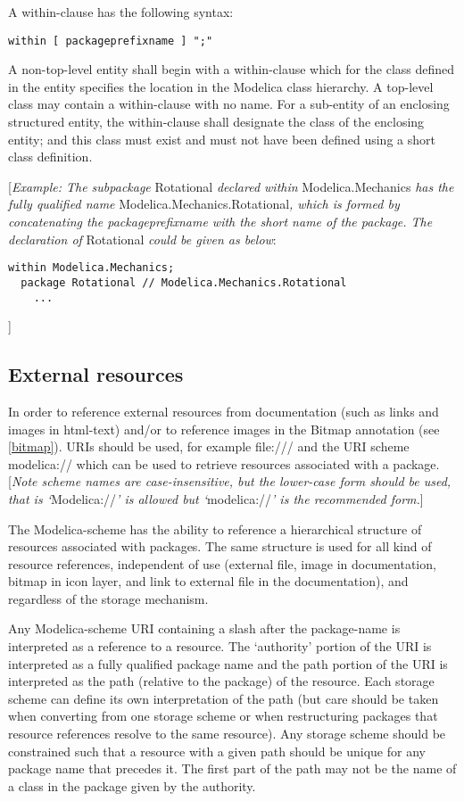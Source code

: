 \documentclass[../MLS.tex]{subfiles}
\begin{document}
A within-clause has the following syntax:

\begin{lstlisting}[language=grammar]
  within [ packageprefixname ] ";"
\end{lstlisting}
  A non-top-level entity shall begin with a within-clause which for the
  class defined in the entity specifies the location in the Modelica class
    hierarchy. A top-level class may contain a within-clause with no name.
    For a sub-entity of an enclosing structured entity, the within-clause
shall designate the class of the enclosing entity; and this class must
exist and must not have been defined using a short class definition.

{[}\emph{Example: The subpackage} Rotational \emph{declared within}
Modelica.Mechanics \emph{has the fully qualified name}
Modelica.Mechanics.Rotational\emph{, which is formed by concatenating
the packageprefixname with the short name of the package. The
declaration of} Rotational \emph{could be given as below}:

\begin{lstlisting}[language=modelica]
  within Modelica.Mechanics;
  package Rotational // Modelica.Mechanics.Rotational
    ...
\end{lstlisting}
{]}

\subsection{External resources}

In order to reference external resources from documentation (such as
links and images in html-text) and/or to reference images in the Bitmap
annotation (see \autoref{bitmap}). URIs should be used, for example
file:/// and the URI scheme modelica:// which can be used to retrieve
resources associated with a package. {[}\emph{Note scheme names are
case-insensitive, but the lower-case form should be used, that is
`}Modelica://\emph{' is allowed but `}modelica://\emph{' is the
recommended form.}{]}

The Modelica-scheme has the ability to reference a hierarchical
structure of resources associated with packages. The same structure is
used for all kind of resource references, independent of use (external
file, image in documentation, bitmap in icon layer, and link to external
file in the documentation), and regardless of the storage mechanism.

Any Modelica-scheme URI containing a slash after the package-name is
interpreted as a reference to a resource. The `authority' portion of the
URI is interpreted as a fully qualified package name and the path
portion of the URI is interpreted as the path (relative to the package)
of the resource. Each storage scheme can define its own interpretation
of the path (but care should be taken when converting from one storage
scheme or when restructuring packages that resource references resolve
to the same resource). Any storage scheme should be constrained such
that a resource with a given path should be unique for any package name
that precedes it. The first part of the path may not be the name of a
class in the package given by the authority.
\end{document}
